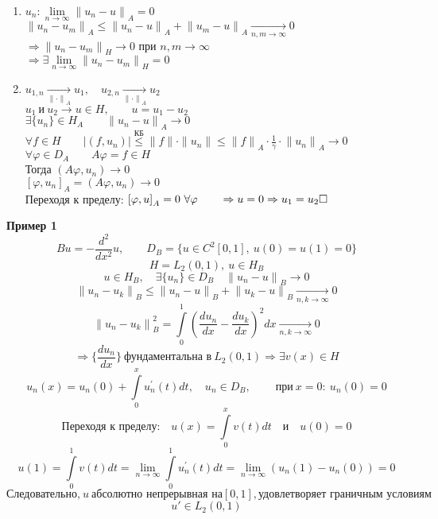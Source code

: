 \documentclass[12pt, a4paper]{article}
\begin{document}
\begin{enumerate}
	\item
	$ {u_n}: \lim\limits_{n \rightarrow \infty} {\|u_n - u\|}_A = 0 $ \\
	$ {\|u_n - u_m\|}_A \leq {\|u_n - u\|}_A + {\|u_m - u\|}_A \underset{n,m \rightarrow \infty}{\rightarrow} 0 $ \\
	$ \Rightarrow {\|u_n - u_m\|}_H \rightarrow 0 $ при $ n,m \rightarrow \infty $ \\
	$ \Rightarrow \exists \lim\limits_{n \rightarrow \infty} {\|u_n - u_m\|}_H = 0 $

	\item
	$ u_{1, n} \underset{{\|\cdot\|}_A}{\rightarrow}  u_1, \quad u_{2, n} \underset{{\|\cdot\|}_A}{\rightarrow}  u_2 $ \\
	$ u_1 \ \text{и} \ u_2 \rightarrow u \in H, \qquad u = u_1 - u_2$ \\
	$ \exists \{u_n\} \in H_A \qquad {\|u_n - u\|}_A \rightarrow 0 $ \\
	$ \forall f \in H \qquad |(f, u_n)| \overset{\text{КБ}}{\leq} \|f\|\cdot\|u_n\| \leq {\|f\|}_A\cdot\frac{1}{\gamma}\cdot{\|u_n\|}_A \rightarrow 0 $ \\
	$ \forall \varphi \in D_A \qquad A\varphi = f \in H $ \\
	Тогда $ (A\varphi, u_n) \rightarrow 0 $ \\
	$ {[\varphi, u_n]}_A = (A\varphi, u_n) \rightarrow 0 $ \\
	Переходя к пределу: $ {[\varphi, u]}_A = 0 \ \forall \varphi \qquad \Rightarrow u = 0 \Rightarrow u_1 = u_2 \hfill \square $
\end{enumerate}

\textbf{Пример 1}
\[ Bu = - \frac{d^2}{d x^2}u, \qquad D_{B} = \{u \in C^2 [0,1], \ u(0) = u(1) = 0 \} \]
\[ H = L_2 (0, 1), \ u \in H_B \]
\[ u \in H_B, \quad \exists \{u_n\} \in D_B \quad {\|u_n - u\|}_B \rightarrow 0 \]
\[ {\|u_n - u_k\|}_B \leq {\|u_n - u\|}_B + {\|u_k - u\|}_B \underset{n,k \rightarrow \infty}{\rightarrow} 0 \]
\[ {\|u_n - u_k\|}_B^2 = \int\limits_{0}^{1} {\left(\frac{du_n}{dx} - \frac{du_k}{dx} \right)}^2 dx \underset{n,k \rightarrow \infty}{\rightarrow} 0 \]
\[ \Rightarrow \{\frac{du_n}{dx}\} \ \text{фундаментальна в} \ L_2(0,1) \Rightarrow \exists v(x) \in H\]
\[ u_n(x) = u_n(0) + \int\limits_{0}^{x} u_n^{'}(t) dt, \quad u_n \in D_B, \qquad \ \text{при} \ x=0:\ u_n(0) = 0 \]
\[ \text{Переходя к пределу:} \quad u(x) = \int\limits_{0}^{x} v(t) dt \quad \text{и} \quad u(0)=0\]
\[ u(1) = \int\limits_{0}^{1} v(t) dt = \lim\limits_{n \rightarrow \infty} \int\limits_{0}^{1} u_n^{'}(t) dt = \lim\limits_{n \rightarrow \infty} \left( u_n(1) - u_n(0) \right) = 0 \]
\[ \text{Следовательно,} \ u \ \text{абсолютно непрерывная на} [0,1], \text{удовлетворяет граничным условиям}\]
\[ u' \in L_2(0,1) \]
\end{document}
